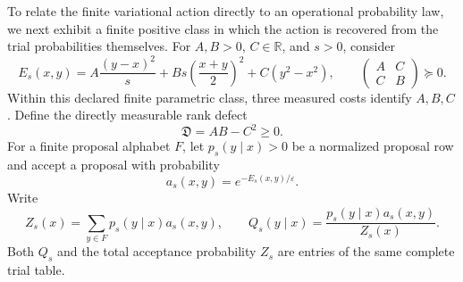 \documentclass[11pt]{article}
\numberwithin{equation}{section}
\theoremstyle{definition}
\theoremstyle{remark}
\newcommand{\R}{\mathbb R}
\begin{document}
To relate the finite variational action directly to an operational probability
law, we next exhibit a finite positive class in which the action is recovered
from the trial probabilities themselves.  For $A,B>0$, $C\in\R$, and $s>0$, consider
\begin{equation}
 E_s(x,y)=A\frac{(y-x)^2}{s}
 +Bs\left(\frac{x+y}{2}\right)^2+C(y^2-x^2),
 \qquad
 \begin{pmatrix}A&C\\ C&B\end{pmatrix}\succeq0.
 \label{eq:main-measured-quadratic-cost}
\end{equation}
Within this declared finite parametric class, three measured costs identify
$A,B,C$.  Define the directly measurable rank defect
\begin{equation}
 \mathfrak D=AB-C^2\ge0.
 \label{eq:main-rank-defect}
\end{equation}
For a finite proposal alphabet $F$, let $p_s(y\mid x)>0$ be a normalized
proposal row and accept a proposal with probability
\begin{equation}
 a_s(x,y)=e^{-E_s(x,y)/\varepsilon}.
 \label{eq:main-operational-acceptance}
\end{equation}
Write
\begin{equation}
 Z_s(x)=\sum_{y\in F}p_s(y\mid x)a_s(x,y),\qquad
 Q_s(y\mid x)=\frac{p_s(y\mid x)a_s(x,y)}{Z_s(x)}.
 \label{eq:main-accepted-row-normalizer}
\end{equation}
Both $Q_s$ and the total acceptance probability $Z_s$ are entries of the same
complete trial table.
\end{document}
